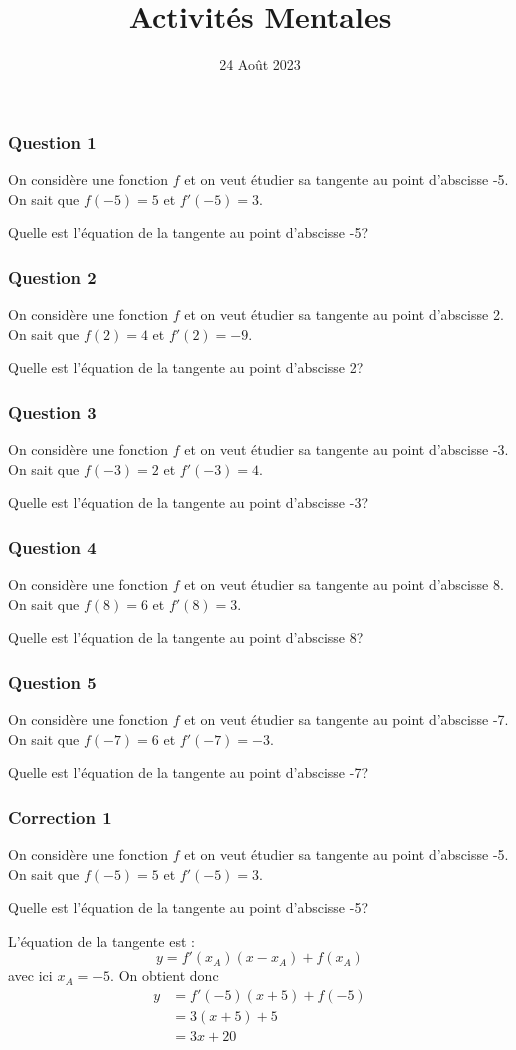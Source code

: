 \documentclass[15pt, mathserif]{beamer}
\title{Activités Mentales}
\date{24 Août 2023}
\begin{document}
\begin{frame}
    \titlepage
\end{frame}

\begin{frame} 
	\frametitle{Question 1}
On considère une fonction $f$ et on veut étudier sa tangente au point d'abscisse -5. On sait que $f(-5)=5$ et $f'(-5)=3$. 
 
 Quelle est l'équation de la tangente au point d'abscisse -5?\end{frame}


\begin{frame} 
	\frametitle{Question 2}
On considère une fonction $f$ et on veut étudier sa tangente au point d'abscisse 2. On sait que $f(2)=4$ et $f'(2)=-9$. 
 
 Quelle est l'équation de la tangente au point d'abscisse 2?\end{frame}


\begin{frame} 
	\frametitle{Question 3}
On considère une fonction $f$ et on veut étudier sa tangente au point d'abscisse -3. On sait que $f(-3)=2$ et $f'(-3)=4$. 
 
 Quelle est l'équation de la tangente au point d'abscisse -3?\end{frame}


\begin{frame} 
	\frametitle{Question 4}
On considère une fonction $f$ et on veut étudier sa tangente au point d'abscisse 8. On sait que $f(8)=6$ et $f'(8)=3$. 
 
 Quelle est l'équation de la tangente au point d'abscisse 8?\end{frame}


\begin{frame} 
	\frametitle{Question 5}
On considère une fonction $f$ et on veut étudier sa tangente au point d'abscisse -7. On sait que $f(-7)=6$ et $f'(-7)=-3$. 
 
 Quelle est l'équation de la tangente au point d'abscisse -7?\end{frame}


\begin{frame}
\vspace{-10mm}
	\frametitle{Correction 1}
On considère une fonction $f$ et on veut étudier sa tangente au point d'abscisse -5. On sait que $f(-5)=5$ et $f'(-5)=3$. 
 
  Quelle est l'équation de la tangente au point d'abscisse -5? 
 
 L'équation de la tangente est : $$y=f'(x_A)(x-x_A) + f(x_A)$$ avec ici $x_A=-5$. On obtient donc 
 \begin{align*} 
 y&= f'(-5)(x+5)+f(-5) \\ 
 &=3(x+5)+5\\ 
 &= 3x+20
 \end{align*}\end{frame}
\end{document}
